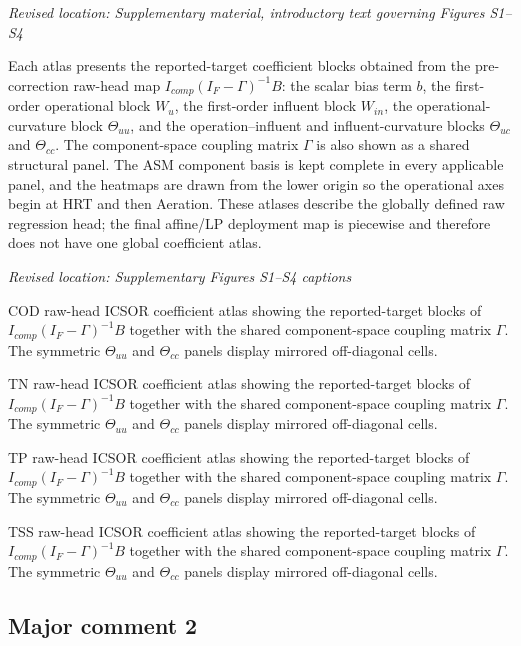 \documentclass[11pt,a4paper]{article}
\newcommand{\excerptlocation}[1]{\par\noindent\textit{Revised location: #1}\par}
\begin{document}
\excerptlocation{Supplementary material, introductory text governing Figures S1--S4}
\begin{revisionexcerpt}
Each atlas presents the reported-target coefficient blocks obtained from the pre-correction raw-head map $I_{comp}(I_F-\Gamma)^{-1}B$: the scalar bias term $b$, the first-order operational block $W_u$, the first-order influent block $W_{in}$, the operational-curvature block $\Theta_{uu}$, and the operation--influent and influent-curvature blocks $\Theta_{uc}$ and $\Theta_{cc}$. The component-space coupling matrix $\Gamma$ is also shown as a shared structural panel. The ASM component basis is kept complete in every applicable panel, and the heatmaps are drawn from the lower origin so the operational axes begin at HRT and then Aeration. These atlases describe the globally defined raw regression head; the final affine/LP deployment map is piecewise and therefore does not have one global coefficient atlas.
\end{revisionexcerpt}

\excerptlocation{Supplementary Figures S1--S4 captions}
\begin{revisionexcerpt}
COD raw-head ICSOR coefficient atlas showing the reported-target blocks of $I_{comp}(I_F-\Gamma)^{-1}B$ together with the shared component-space coupling matrix $\Gamma$. The symmetric $\Theta_{uu}$ and $\Theta_{cc}$ panels display mirrored off-diagonal cells.

TN raw-head ICSOR coefficient atlas showing the reported-target blocks of $I_{comp}(I_F-\Gamma)^{-1}B$ together with the shared component-space coupling matrix $\Gamma$. The symmetric $\Theta_{uu}$ and $\Theta_{cc}$ panels display mirrored off-diagonal cells.

TP raw-head ICSOR coefficient atlas showing the reported-target blocks of $I_{comp}(I_F-\Gamma)^{-1}B$ together with the shared component-space coupling matrix $\Gamma$. The symmetric $\Theta_{uu}$ and $\Theta_{cc}$ panels display mirrored off-diagonal cells.

TSS raw-head ICSOR coefficient atlas showing the reported-target blocks of $I_{comp}(I_F-\Gamma)^{-1}B$ together with the shared component-space coupling matrix $\Gamma$. The symmetric $\Theta_{uu}$ and $\Theta_{cc}$ panels display mirrored off-diagonal cells.
\end{revisionexcerpt}

\subsection*{Major comment 2}
\end{document}
